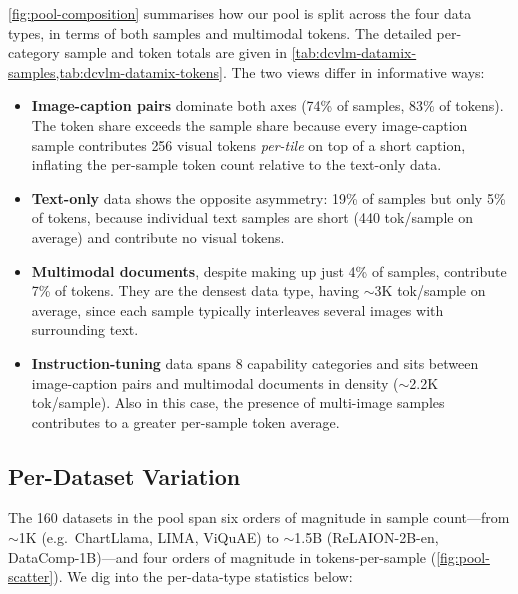 \figpoolcomposition

\cref{fig:pool-composition} summarises how our pool is split across the four data types, in terms of both samples and multimodal tokens. 
The detailed per-category sample and token totals are given in \cref{tab:dcvlm-datamix-samples,tab:dcvlm-datamix-tokens}.
The two views differ in informative ways:

\begin{itemize}[leftmargin=*,itemsep=1pt]
\item \textbf{Image-caption pairs} dominate both axes (74\% of samples, 83\% of tokens). 
The token share exceeds the sample share because every image-caption sample contributes $  $256 visual tokens \textit{per-tile} on top of a short caption, inflating the per-sample token count relative to the text-only data.
\item \textbf{Text-only} data shows the opposite asymmetry: 19\% of samples but only 5\% of tokens, because individual text samples are short (440 tok/sample on average) and contribute no visual tokens.
\item \textbf{Multimodal documents}, despite making up just 4\% of samples, contribute 7\% of tokens. 
They are the densest data type, having $\sim$3K tok/sample on average, since each sample typically interleaves several images with surrounding text.
\item \textbf{Instruction-tuning} data spans 8 capability categories and sits between image-caption pairs and multimodal documents in density ($\sim$2.2K tok/sample). 
Also in this case, the presence of multi-image samples contributes to a greater per-sample token average.
\end{itemize}


\subsection{Per-Dataset Variation}\label{app:pool-perdataset}

\figpoolscatter

The 160 datasets in the pool span six orders of magnitude in sample count---from $\sim$1K (e.g.\ ChartLlama, LIMA, ViQuAE) to $\sim$1.5B (ReLAION-2B-en, DataComp-1B)---and four orders of magnitude in tokens-per-sample (\cref{fig:pool-scatter}). We dig into the per-data-type statistics below:


